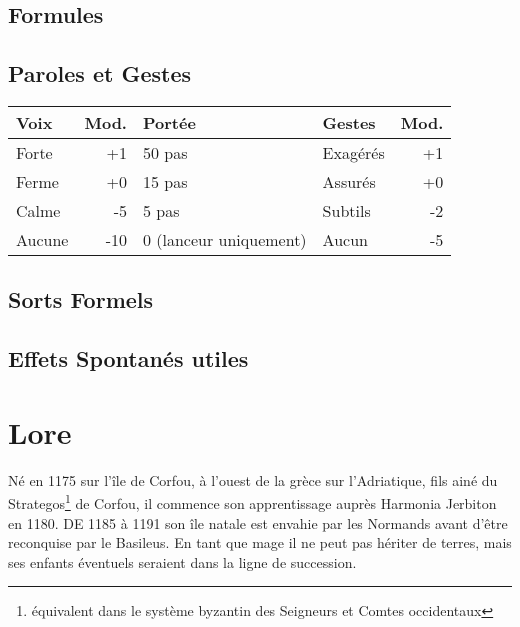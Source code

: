 \magusArtsLong

\subsection*{Formules}
\begin{multicols}{2}
\castingformulas

\begin{small}
\end{small}

\end{multicols}
\subsection*{Paroles et Gestes}
\begin{tabularx}{\textwidth}{|X|r|l||X|r|}
\hline
Voix   & Mod. & Portée                          & Gestes   & Mod. \\ \hline
Forte  &  +1  & 50 pas                          & Exagérés & +1 \\
Ferme  &  +0  & 15 pas                          & Assurés  & +0 \\
Calme  &  -5  & 5 pas                           & Subtils  & -2 \\
Aucune & -10  & 0 {\small (lanceur uniquement)} & Aucun    & -5 \\ \hline
\end{tabularx}
\pagebreak
\subsection*{Sorts Formels}
\begin{multicols}{2}
\longspells
\end{multicols}
\subsection*{Effets Spontanés utiles}

\begin{multicols}{2}

\end{multicols}

\pagebreak

\section*{Lore}
Né en 1175 sur l'île de Corfou, à l'ouest de la grèce sur l'Adriatique, fils ainé du Strategos\footnote{équivalent dans le système byzantin des Seigneurs et Comtes occidentaux} de Corfou, il commence son apprentissage auprès Harmonia Jerbiton en 1180. DE 1185 à 1191 son île natale est envahie par les Normands avant d'être reconquise par le Basileus. En tant que mage il ne peut pas hériter de terres, mais ses enfants éventuels seraient dans la ligne de succession.

